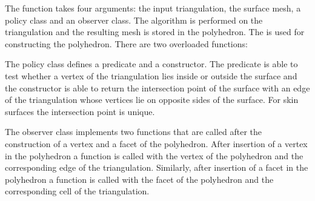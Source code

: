 The function takes four arguments: the input triangulation, the
surface mesh, a policy class and an observer class.  The algorithm is
performed on the triangulation and the resulting mesh is stored in the
polyhedron. The  is used
for constructing the polyhedron. There are two overloaded functions:


The policy class defines a predicate and a constructor. The predicate
is able to test whether a vertex of the triangulation lies inside or
outside the surface and the constructor is able to return the
intersection point of the surface with an edge of the triangulation
whose vertices lie on opposite sides of the surface. For skin surfaces
the intersection point is unique.

The observer class implements two functions that are called after the
construction of a vertex and a facet of the polyhedron. After
insertion of a vertex in the polyhedron a function is called with the
vertex of the polyhedron and the corresponding edge of the
triangulation. Similarly, after insertion of a facet in the polyhedron
a function is called with the facet of the polyhedron and the
corresponding cell of the triangulation. 

